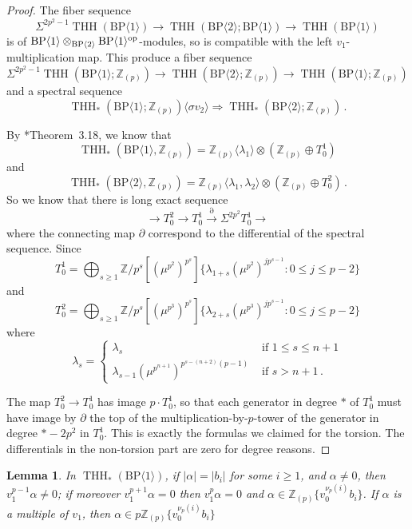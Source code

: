 \documentclass[11pt]{amsart}
\newcommand{\mr}[1]{\mathrm{#1}}
\newcommand{\Z}{\mathbb{Z}}
\newcommand{\BP}{\mr{BP}}
\DeclareMathOperator{\THH}{THH}
\newcommand{\op}{\textup{op}}
\newtheorem{lemma}[equation]{Lemma}
\theoremstyle{definition}
\numberwithin{equation}{section}
\numberwithin{figure}{section}
\begin{document}
\begin{proof}
  The fiber sequence 
  \[ 
    \Sigma^{2p^2-1}\THH(\BP\langle 1\rangle)\to \THH(\BP\langle 2\rangle ;\BP\langle 1\rangle)\to \THH(\BP\langle 1\rangle)
  \]
  is of $\BP\langle 1\rangle \otimes_{\BP \langle 2 \rangle} \BP\langle 1\rangle^\op$-modules, so is compatible with the left $v_1$-multiplication map. This produce a fiber sequence
  \[
    \Sigma^{2p^2-1}\THH(\BP\langle 1\rangle; \Z_{(p)})\to \THH(\BP\langle 2\rangle ; \Z_{(p)})\to \THH(\BP\langle 1\rangle; \Z_{(p)})
  \]
  and a spectral sequence
  \[
    \THH_*(\BP\langle 1\rangle; \Z_{(p)}) \langle \sigma v_2 \rangle \Rightarrow \THH_*(\BP \langle 2 \rangle; \Z_{(p)}) \,.
  \]

  By \cite{ACH24}*{Theorem~3.18}, we know that 
  \[
    \THH_*(\BP\langle 1\rangle,\mathbb{Z}_{(p)})=\mathbb{Z}_{(p)}\langle \lambda_1\rangle \otimes (\mathbb{Z}_{(p)}\oplus T_0^1)
  \]
  and 
  \[
    \THH_*(\BP\langle 2\rangle,\mathbb{Z}_{(p)})=\mathbb{Z}_{(p)}\langle \lambda_1,\lambda_2\rangle \otimes (\mathbb{Z}_{(p)}\oplus T_0^2)\,.
  \]
  So we know that there is long exact sequence 
  \[ 
    \to T_0^{2} \to T_0^1\overset{\partial}{\to} \Sigma^{2p^2}T_0^1 \to 
  \]
  where the connecting map $\partial$ correspond to the differential of the spectral sequence.
  Since 
  \[ 
    T_0^1=\bigoplus_{s\ge 1}\mathbb{Z}/p^s[(\mu^{p^2})^{p^s}]\{\lambda_{1+s}(\mu^{p^2})^{jp^{s-1}}: 0\le j\le p-2\}
  \]
  and 
  \[ 
    T_0^2=\bigoplus_{s\ge 1}\mathbb{Z}/p^s[(\mu^{p^3})^{p^s}]\{\lambda_{2+s}(\mu^{p^3})^{jp^{s-1}}: 0\le j\le p-2\}
  \]
  where 
  \[ 
    \lambda_{s}=\begin{cases} \lambda_s & \text{ if } 1\le s\le n+1  \\ 
      \lambda_{s-1}(\mu^{p^{n+1}})^{p^{s-(n+2)}(p-1)} & \text{ if } s>n+1 \,.
    \end{cases}
  \]
  
  The map $T_0^2 \rightarrow T_0^1$ has image $p \cdot T_0^1$, so that each generator in degree $*$ of $T_0^1$ must have image by $\partial$ the top of the multiplication-by-$p$-tower of the generator in degree $*-2p^2$ in $T_0^1$. This is exactly the formulas we claimed for the torsion. The differentials in the non-torsion part are zero for degree reasons.
\end{proof}

\begin{lemma} \label{lem:thhell1}
  In $\THH_*(\BP\langle 1\rangle)$, if $|\alpha| = |b_i|$ for some $i \geq 1$, and $\alpha \neq 0$, then $v_1^{p-1} \alpha \neq 0$; if moreover $v_1^{p+1} \alpha = 0$ then $v_1^p \alpha = 0$ and $\alpha \in \Z_{(p)} \{ v_0^{\nu_p(i)}b_i \}$. If $\alpha$ is a multiple of $v_1$, then $\alpha \in p\Z_{(p)} \{ v_0^{\nu_p(i)}b_i \}$ 
\end{lemma}
\end{document}
